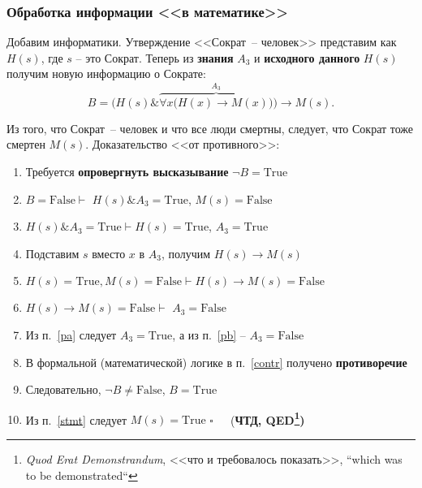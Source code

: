 \documentclass[10pt]{beamer}
\newcommand{\Tr}{\mbox{True}}
\newcommand{\Fa}{\mbox{False}}
\begin{document}
\begin{frame}[fragile]
  \frametitle{Обработка информации <<в математике>>}
\small
Добавим информатики. Утверждение <<Сократ~-- человек>> представим как $H(s)$, где $s$ -- это Сократ.  Теперь из \textbf{знания} $A_3$ и \textbf{исходного данного} $H(s)$ получим новую информацию о Сократе:
$$
B = \Big (H(s) \& \overbrace{\forall x \big ( H(x)\to M(x)\big )}^{A_3} \Big ) \to M(s).
$$

Из того, что Сократ~-- человек и что все люди смертны, следует, что Сократ тоже смертен $M(s)$.  Доказательство <<от противного>>:

\begin{enumerate}
\item Требуется \textbf{опровергнуть высказывание} $\neg B = \Tr$
\item $B = \Fa \vdash$ $H(s) \& A_3 = \Tr$, $M(s) = \Fa$
\item $H(s) \&  A_3 = \Tr \vdash H(s) = \Tr$, {\color{red}$A_3 = \Tr$} \label{pa}
\item Подставим $s$ вместо $x$ в $A_3$, получим $H(s)\to M(s)$
\item $H(s)= \Tr, M(s)= \Fa \vdash H(s)\to M(s) = \Fa$
\item $H(s)\to M(s) = \Fa\vdash$ {\color{blue} $A_3 = \Fa$} \label{pb}
\item Из п.~\ref{pa} следует {\color{red}$A_3 = \Tr$}, а из п.~\ref{pb} -- {\color{blue} $A_3 = \Fa$} \label{contr}
\item В формальной (математической) логике в п.~\ref{contr} получено \textbf{противоречие}
\item Следовательно, $\neg B \neq \Fa$, $B = \Tr$ \label{stmt}
\item Из п.~\ref{stmt} следует $M(s)=\Tr$ $\square$\ \ \ (\textbf{ЧТД, QED\footnote{\emph{Quod Erat Demonstrandum}, <<что и требовалось показать>>, ``which was to be demonstrated``})}
\end{enumerate}
\end{frame}
\end{document}
